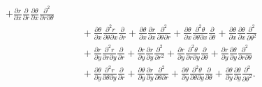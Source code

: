 \documentclass[oneside]{article}
\begin{document}
\begin{itemize}
\begin{align*}
      + \frac{\partial r}{\partial x}\frac{\partial}{\partial r}
        \frac{\partial\theta}{\partial x}\frac{\partial^2}{\partial r\partial\theta} \\
  &\qquad+ \frac{\partial\theta}{\partial x}
        \frac{\partial^2 r}{\partial\theta\partial x}\frac{\partial}{\partial r}
      + \frac{\partial\theta}{\partial x}
        \frac{\partial r}{\partial x}\frac{\partial^2}{\partial\theta\partial r}
      + \frac{\partial\theta}{\partial x}
        \frac{\partial^2 \theta}{\partial\theta\partial x}\frac{\partial}{\partial\theta}
      + \frac{\partial\theta}{\partial x}
        \frac{\partial\theta}{\partial x}\frac{\partial^2}{\partial\theta^2} \\
  &\qquad+ \frac{\partial r}{\partial y}
           \frac{\partial^2 r}{\partial r\partial y}\frac{\partial}{\partial r}
      + \frac{\partial r}{\partial y}
           \frac{\partial r}{\partial y}\frac{\partial^2}{\partial r^2}
      + \frac{\partial r}{\partial y}
        \frac{\partial^2 \theta}{\partial r\partial y}
        \frac{\partial}{\partial\theta}
      + \frac{\partial r}{\partial y}
        \frac{\partial\theta}{\partial y}
        \frac{\partial^2}{\partial r\partial\theta} \\
  &\qquad+ \frac{\partial\theta}{\partial y}
           \frac{\partial^2 r}{\partial\theta\partial y}\frac{\partial}{\partial r}
      + \frac{\partial\theta}{\partial y}
           \frac{\partial r}{\partial y}\frac{\partial^2}{\partial\theta\partial r}
      + \frac{\partial\theta}{\partial y}
         \frac{\partial^2 \theta}{\partial\theta\partial y}\frac{\partial}{\partial\theta}
      + \frac{\partial\theta}{\partial y}
         \frac{\partial\theta}{\partial y}\frac{\partial^2}{\partial\theta^2} \text{.}
\end{align*}


\end{itemize}
\end{document}
